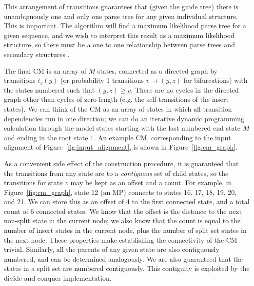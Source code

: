 \documentclass[11pt]{article}
\begin{document}
This arrangement of transitions guarantees that (given the guide tree)
there is unambiguously one and only one parse tree for any given
individual structure. This is important. The algorithm will find a
maximum likelihood parse tree for a given sequence, and we wish to
interpret this result as a maximum likelihood structure, so there must
be a one to one relationship between parse trees and secondary
structures \cite{Giegerich00}.

The final CM is an array of $M$ states, connected as a directed graph
by transitions $t_v(y)$ (or probability 1 transitions $v \rightarrow
(y,z)$ for bifurcations) with the states numbered such that $(y,z)
\geq v$. There are no cycles in the directed graph other than cycles
of zero length (e.g. the self-transitions of the insert states). We
can think of the CM as an array of states in which all transition
dependencies run in one direction; we can do an iterative dynamic
programming calculation through the model states starting with the
last numbered end state $M$ and ending in the root state $1$.  An
example CM, corresponding to the input alignment of
Figure~\ref{fig:input_alignment}, is shown in
Figure~\ref{fig:cm_graph}.

As a convenient side effect of the construction procedure, it is
guaranteed that the transitions from any state are to a
\emph{contiguous} set of child states, so the transitions for state
$v$ may be kept as an offset and a count. For example, in
Figure~\ref{fig:cm_graph}, state 12 (an MP) connects to states 16, 17,
18, 19, 20, and 21. We can store this as an offset of 4 to the first
connected state, and a total count of 6 connected states.  We know
that the offset is the distance to the next non-split state in the
current node; we also know that the count is equal to the number of
insert states in the current node, plus the number of split set states
in the next node. These properties make establishing the connectivity
of the CM trivial. Similarly, all the parents of any given state are
also contiguously numbered, and can be determined analogously. We are
also guaranteed that the states in a split set are numbered
contiguously.  This contiguity is exploited by the divide and conquer
implementation.
\end{document}
